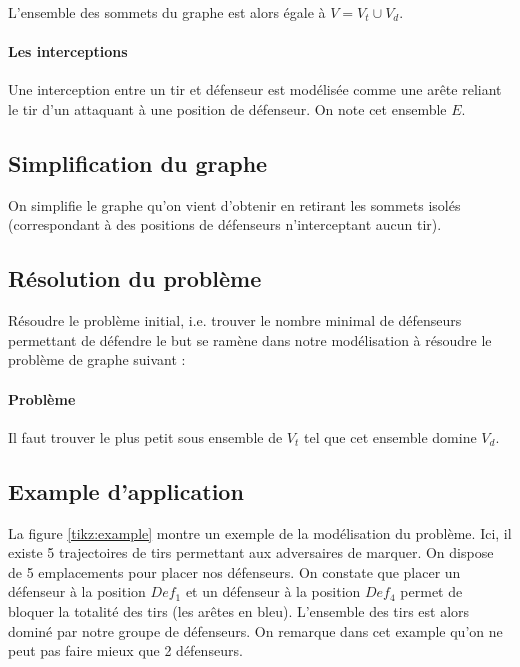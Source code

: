 \documentclass{article}
\begin{document}
L'ensemble des sommets du graphe est alors égale à $V = V_t \cup V_d$.

\paragraph{Les interceptions}
Une interception entre un tir et défenseur est modélisée comme une arête reliant le tir d'un attaquant à une position de défenseur. On note cet ensemble $E$.

\subsection{Simplification du graphe}
On simplifie le graphe qu'on vient d'obtenir en retirant les sommets isolés (correspondant à des positions de défenseurs n'interceptant aucun tir).

\subsection{Résolution du problème}
Résoudre le problème initial, i.e. trouver le nombre minimal de défenseurs permettant de défendre le but se ramène dans notre modélisation à résoudre le problème de graphe suivant :

\paragraph{Problème} Il faut trouver le plus petit sous ensemble de $V_t$ tel que cet ensemble domine $V_d$.

\subsection{Example d'application}

La figure \ref{tikz:example} montre un exemple de la modélisation du problème. Ici, il existe 5 trajectoires de tirs permettant aux adversaires de marquer. On dispose de 5 emplacements pour placer nos défenseurs.  On constate que placer un défenseur à la position $Def_1$ et un défenseur à la position $Def_4$ permet de bloquer la totalité des tirs (les arêtes en bleu). L'ensemble des tirs est alors dominé par notre groupe de défenseurs. On remarque dans cet example qu'on ne peut pas faire mieux que 2 défenseurs.
\end{document}
